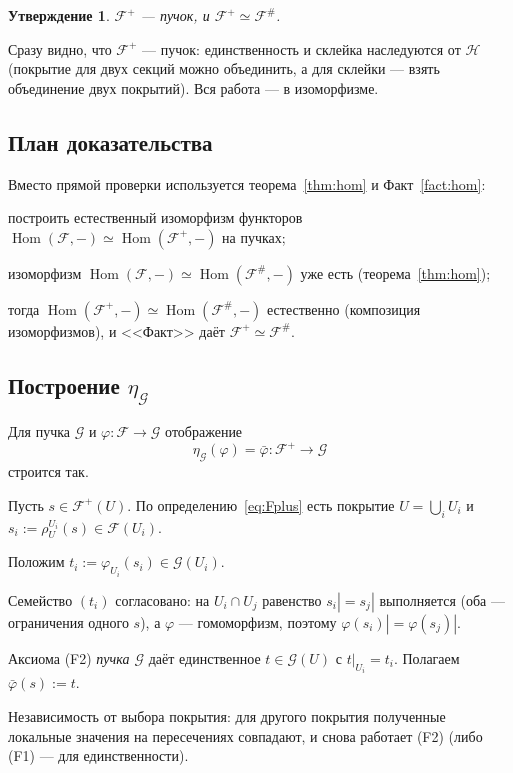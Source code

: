 \documentclass[11pt,b5paper]{article}
\newcommand{\Hom}{\operatorname{Hom}}
\newcommand{\Shv}[1]{\mathscr{#1}}   %
\newcommand{\res}{\rho}              %
\theoremstyle{plain}
\newtheorem{thminner}{Утверждение}[section]
\theoremstyle{definition}
\theoremstyle{remark}
\newcommand{\thmbeg}{%
  \par\smallskip
  \begin{lrbox}{\thmbox}%
  \begin{minipage}{\linewidth}}
\newcommand{\thmend}{%
  \end{minipage}%
  \end{lrbox}%
  \noindent\usebox{\thmbox}%
  \par\smallskip}
\newenvironment{thm}{\thmbeg\begin{thminner}}{\end{thminner}\thmend}
\let\brutsubsection\subsection
\renewcommand{\subsection}{\Needspace{5\baselineskip}\brutsubsection}
\begin{document}
\begin{thm}\label{thm:Fplus}
$\Shv{F}^{+}$ --- пучок, и $\Shv{F}^{+}\simeq\Shv{F}^{\#}$.
\end{thm}

Сразу видно, что $\Shv{F}^{+}$ --- пучок: единственность и склейка
наследуются от $\Shv{H}$ (покрытие для двух секций можно объединить,
а для склейки --- взять объединение двух покрытий). Вся работа ---
в изоморфизме.

\subsection{План доказательства}
Вместо прямой проверки используется теорема~\ref{thm:hom} и
Факт~\ref{fact:hom}:
\begin{conditions}
\item построить естественный изоморфизм функторов
 $\Hom(\Shv{F},-)\simeq\Hom(\Shv{F}^{+},-)$ на пучках;
\item изоморфизм $\Hom(\Shv{F},-)\simeq\Hom(\Shv{F}^{\#},-)$ уже есть
 (теорема~\ref{thm:hom});
\item тогда $\Hom(\Shv{F}^{+},-)\simeq\Hom(\Shv{F}^{\#},-)$ естественно
 (композиция изоморфизмов), и <<Факт>> даёт
 $\Shv{F}^{+}\simeq\Shv{F}^{\#}$.
\end{conditions}

\subsection{Построение $\eta_{\Shv{G}}$}
Для пучка $\Shv{G}$ и $\varphi\colon\Shv{F}\to\Shv{G}$ отображение
\[
 \eta_{\Shv{G}}(\varphi)=\bar\varphi\colon\Shv{F}^{+}\to\Shv{G}
\]
строится так.
\begin{conditions}
\item Пусть $s\in\Shv{F}^{+}(U)$. По определению~\eqref{eq:Fplus} есть
 покрытие $U=\bigcup_iU_i$ и $s_i:=\res^{U_i}_{U}(s)\in\Shv{F}(U_i)$.
\item Положим $t_i:=\varphi_{U_i}(s_i)\in\Shv{G}(U_i)$.
\item Семейство $(t_i)$ согласовано: на $U_i\cap U_j$ равенство
 $s_i|=s_j|$ выполняется (оба --- ограничения одного $s$), а $\varphi$
 --- гомоморфизм, поэтому $\varphi(s_i)|=\varphi(s_j)|$.
\item Аксиома (F2) \emph{пучка $\Shv{G}$} даёт единственное
 $t\in\Shv{G}(U)$ с $t|_{U_i}=t_i$. Полагаем $\bar\varphi(s):=t$.
\item Независимость от выбора покрытия: для другого покрытия полученные
 локальные значения на пересечениях совпадают, и снова работает (F2)
 (либо (F1) --- для единственности).
\end{conditions}
\end{document}
